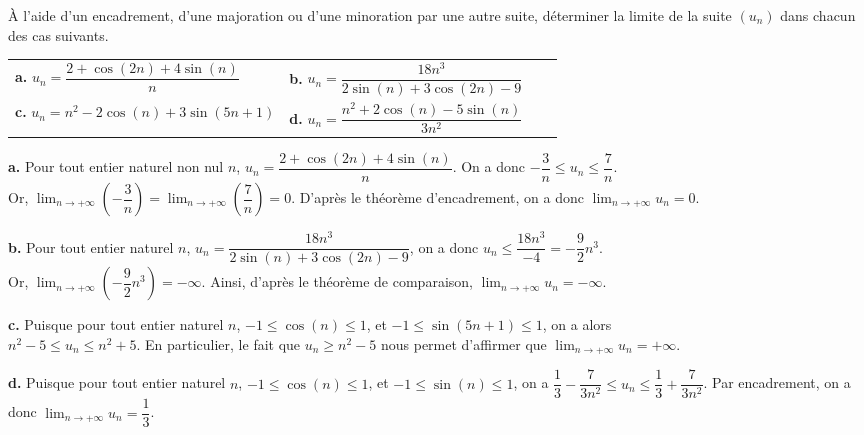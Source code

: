 \documentclass[11pt,fleqn, openany]{book} %
\begin{document}
\begin{exercise} À l'aide d'un encadrement, d'une majoration ou d'une minoration par une autre suite, déterminer la limite de la suite $(u_n)$ dans chacun des cas suivants.
\renewcommand{\arraystretch}{2}
\begin{center}
\begin{tabularx}{\linewidth}{XXXX}
\textbf{a.} $ u_n = \dfrac{2+\cos(2n)+4\sin(n)}{n}$ &\textbf{b.}  $ u_n=\dfrac{18n^3}{2\sin(n)+3\cos(2n)-9}$ \\
\textbf{c.} $ u_n=n^2-2\cos(n)+3\sin(5n+1)$  &\textbf{d.}  $u_n = \dfrac{n^2+2\cos(n)-5\sin(n)}{3n^2}$ \\
\end{tabularx}
\end{center}\end{exercise}

\begin{solution}\textbf{a.} Pour tout entier naturel non nul $n$, $u_n=\dfrac{2+\cos(2n)+4\sin(n)}{n}$. On a donc $-\dfrac{3}{n} \leqslant u_n \leqslant \dfrac{7}{n}$. \\ Or, $\displaystyle \lim_{n\to + \infty} \left( -\dfrac{3}{n}\right)=\displaystyle \lim_{n\to + \infty} \left( \dfrac{7}{n}\right)=0$. D'après le théorème d'encadrement, on a donc $\displaystyle \lim_{n\to + \infty} u_n=0$.

\textbf{b.} Pour tout entier naturel $n$, $u_n=\dfrac{18n^3}{2\sin(n)+3\cos(2n)-9}$, on a donc $u_n \leqslant \dfrac{18n^3}{-4}=-\dfrac{9}{2}n^3$. \\ Or, $\displaystyle \lim_{n\to + \infty} \left( -\dfrac{9}{2}n^3 \right)=-\infty$. Ainsi, d'après le théorème de comparaison, $\displaystyle \lim_{n\to + \infty} u_n = -\infty$.

\textbf{c.} Puisque pour tout entier naturel $n$, $-1\leqslant \cos(n) \leqslant 1$, et $-1 \leqslant \sin(5n+1) \leqslant 1$, on a alors \\$ n^2-5 \leqslant u_n \leqslant n^2+5$. En particulier, le fait que $u_n \geqslant n^2-5$ nous permet d'affirmer que $\displaystyle\lim_{n \to + \infty} u_n=+\infty $.


\textbf{d.} Puisque pour tout entier naturel $n$, $-1\leqslant \cos(n) \leqslant 1$, et $-1 \leqslant \sin(n) \leqslant 1$, on a $\dfrac{1}{3}-\dfrac{7}{3n^2}\leqslant u_n \leqslant \dfrac{1}{3}+\dfrac{7}{3n^2}$. Par encadrement, on a donc $\displaystyle\lim_{n \to + \infty}u_n=\dfrac{1}{3}$.\end{solution}
\end{document}
